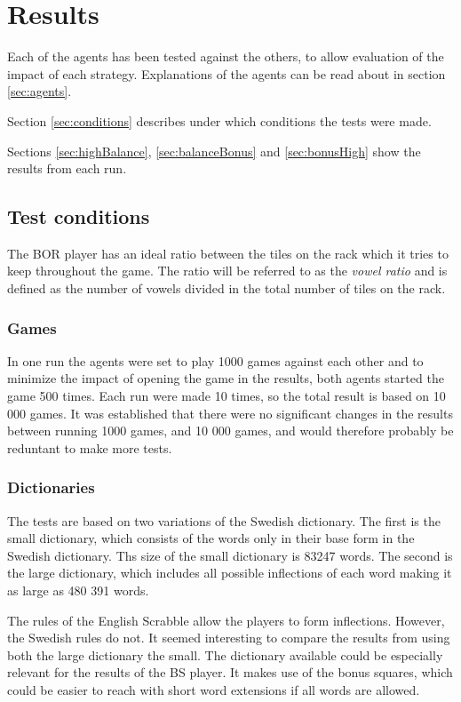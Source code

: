 \documentclass[a4paper, 12pt]{report}
\begin{document}
\chapter{Results}
\label{sec:analysis}
Each of the agents has been tested against the others, to allow evaluation of the impact of each strategy. Explanations of the agents can be read about in section \ref{sec:agents}. 

Section \ref{sec:conditions} describes under which conditions the tests were made.

Sections \ref{sec:highBalance}, \ref{sec:balanceBonus} and \ref{sec:bonusHigh} show the results from each run.
 
\section{Test conditions}
The BOR player has an ideal ratio between the tiles on the rack which it tries to keep throughout the game. The ratio will be referred to as the \emph{vowel ratio} and is defined as the number of vowels divided in the total number of tiles on the rack.

\label{sec:conditions}
\subsection{Games}
In one run the agents were set to play 1000 games against each other and to minimize the impact of opening the game in the results, both agents started the game 500 times. Each run were made 10 times, so the total result is based on 10 000 games. It was established that there were no significant changes in the results between running 1000 games, and 10 000 games, and would therefore probably be reduntant to make more tests. 

\subsection{Dictionaries}

The tests are based on two variations of the Swedish dictionary. The first is the small dictionary, which consists of the words only in their base form in the Swedish dictionary. Ths size of the small dictionary is 83247 words. The second is the large dictionary, which includes all possible inflections of each word making it as large as 480 391 words.

The rules of the English Scrabble allow the players to form inflections. However, the Swedish rules do not. It seemed interesting to compare the results from using both the large dictionary the small. The dictionary available could be especially relevant for the results of the BS player. It makes use of the bonus squares, which could be easier to reach with short word extensions if all words are allowed.
\end{document}
